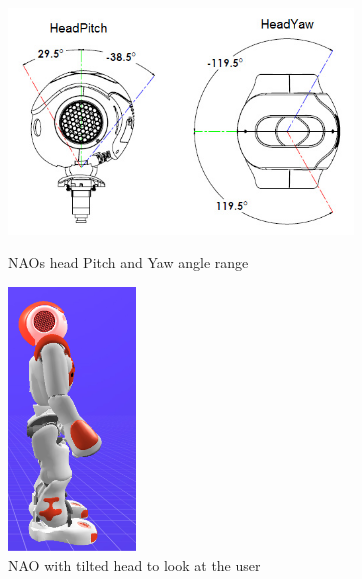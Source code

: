 \begin{figure}	 	
	\begin{minipage}
		{.6
		\textwidth}  	
		\includegraphics[height=60mm]{figures/content/nao-head.jpg} \caption{NAOs head Pitch and Yaw angle range} \label{fg:nao:head} 
	\end{minipage}
	\begin{minipage}
		{.3 
		\textwidth}  
		\centering
		\includegraphics[height=70mm]{figures/content/nao-head-stand.jpg} \caption{NAO with tilted head to look at the user} \label{fg:nao:head:stand} 
	\end{minipage}	
\end{figure}


